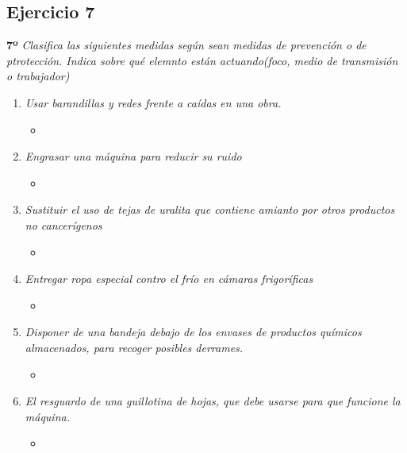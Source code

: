 \documentclass{article}
\begin{document}
      \subsection{Ejercicio 7}
        \textbf{7º} \textit{Clasifica las siguientes medidas según sean medidas de prevención o de ptrotección. Indica sobre qué elemnto están actuando(foco, medio de transmisión o trabajador)}
        \\
        \begin{enumerate}[label=(\alph*)]
          \item \textit{Usar barandillas y redes frente a caídas en una obra.}
            \begin{itemize}
              \item 
            \end{itemize}
          \item \textit{Engrasar una máquina para reducir su ruido}
            \begin{itemize}
              \item 
            \end{itemize}
          \item \textit{Sustituir el uso de tejas de uralita que contiene amianto por otros productos no cancerígenos}
            \begin{itemize}
              \item 
            \end{itemize}
          \item \textit{Entregar ropa especial contro el frío en cámaras frigoríficas}
            \begin{itemize}
              \item 
            \end{itemize}
          \item \textit{Disponer de una bandeja debajo de los envases de productos químicos almacenados, para recoger posibles derrames.}
            \begin{itemize}
              \item 
            \end{itemize}
          \item \textit{El resguardo de una guillotina de hojas, que debe usarse para que funcione la máquina.}
            \begin{itemize}
              \item
            \end{itemize}
        \end{enumerate}
\end{document}
